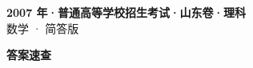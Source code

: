 \documentclass[zihao=-4, a4paper]{ctexart}
\begin{document}
\begin{center}
  {\Large\bfseries 2007 年·普通高等学校招生考试·山东卷·理科}\\[4pt]
  {\large 数学 · 简答版}
\end{center}
\medskip
{}

\clearpage
{}
\begin{center}{\Large\bfseries 答案速查}\end{center}
\medskip

\end{document}
